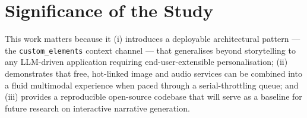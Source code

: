 \section{Significance of the Study}
This work matters because it (i) introduces a deployable architectural
pattern --- the \texttt{custom\_elements} context channel --- that
generalises beyond storytelling to any LLM-driven application
requiring end-user-extensible personalisation; (ii) demonstrates that
free, hot-linked image and audio services can be combined into a
fluid multimodal experience when paced through a serial-throttling
queue; and (iii) provides a reproducible open-source codebase that
will serve as a baseline for future research on interactive narrative
generation.
